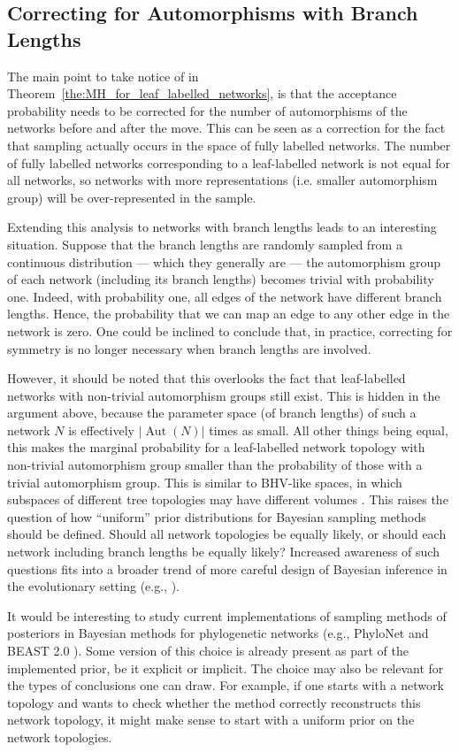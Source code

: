 \documentclass{article}
\theoremstyle{definition}
\DeclareMathOperator{\Aut}{Aut}
\begin{document}
\subsection{Correcting for Automorphisms with Branch Lengths}
The main point to take notice of in Theorem~\ref{the:MH_for_leaf_labelled_networks}, is that the acceptance probability needs to be corrected for the number of automorphisms of the networks before and after the move. This can be seen as a correction for the fact that sampling actually occurs in the space of fully labelled networks. The number of fully labelled networks corresponding to a leaf-labelled network is not equal for all networks, so networks with more representations (i.e. smaller automorphism group) will be over-represented in the sample. 

Extending this analysis to networks with branch lengths leads to an interesting situation. Suppose that the branch lengths are randomly sampled from a continuous distribution --- which they generally are --- the automorphism group of each network (including its branch lengths) becomes trivial with probability one. Indeed, with probability one, all edges of the network have different branch lengths. Hence, the probability that we can map an edge to any other edge in the network is zero. One could be inclined to conclude that, in practice, correcting for symmetry is no longer necessary when branch lengths are involved.

However, it should be noted that this overlooks the fact that leaf-labelled networks with non-trivial automorphism groups still exist. This is hidden in the argument above, because the parameter space (of branch lengths) of such 
a network $N$ is effectively $|\Aut(N)|$ times as small. All other things being equal, this makes the marginal probability for a leaf-labelled network topology with non-trivial automorphism group smaller than the probability of those with a trivial automorphism group. This is similar to BHV-like spaces, in which subspaces of different tree topologies may have different volumes \cite{gavryushkin2016space}.
This raises the question of how ``uniform'' prior distributions for Bayesian sampling methods should be defined. Should all network topologies be equally likely, or should each network including branch lengths be equally likely? 
Increased awareness of such questions fits into a broader trend of more careful design of Bayesian inference in the evolutionary setting (e.g., \cite{mendes2025validate}).

It would be interesting to study current implementations of sampling methods of posteriors in Bayesian methods for phylogenetic networks (e.g., PhyloNet \cite{wen2016bayesian} and BEAST 2.0 \cite{zhang2018bayesian}). Some version of this choice is already present as part of the implemented prior, be it explicit or implicit. The choice may also be relevant for the types of conclusions one can draw. For example, if one starts with a network topology and wants to check whether the method correctly reconstructs this network topology, it might make sense to start with a uniform prior on the network topologies.
\end{document}
